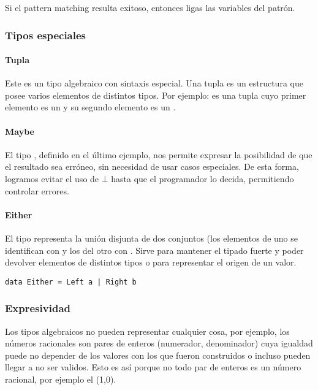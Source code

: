Si el pattern matching resulta exitoso, entonces ligas las variables del patrón.

\subsubsection{Tipos especiales}
\paragraph{Tupla} Este es un tipo algebraico con sintaxis especial. Una tupla es un estructura que posee varios elementos de distintos tipos. Por ejemplo:  es una tupla cuyo primer elemento es un  y su segundo elemento es un .

\paragraph{Maybe} El tipo , definido en el último ejemplo, nos permite expresar la posibilidad de que el resultado sea erróneo, sin necesidad de usar casos especiales. De esta forma, logramos evitar el uso de $\bot$ hasta que el programador lo decida, permitiendo controlar errores.

\paragraph{Either} El tipo  representa la unión disjunta de dos conjuntos (los elementos de uno se identifican con  y los del otro con . Sirve para mantener el tipado fuerte y poder devolver elementos de distintos tipos o para representar el origen de un valor.
\begin{centrado}
	\begin{verbatim}
data Either = Left a | Right b
	\end{verbatim}
\end{centrado}

\subsubsection{Expresividad}
Los tipos algebraicos no pueden representar cualquier cosa, por ejemplo, los números racionales son pares de enteros (numerador, denominador) cuya igualdad puede no depender de los valores con los que fueron construidos o incluso pueden llegar a no ser validos. Esto es así porque no todo par de enteros es un número racional, por ejemplo el (1,0). 

